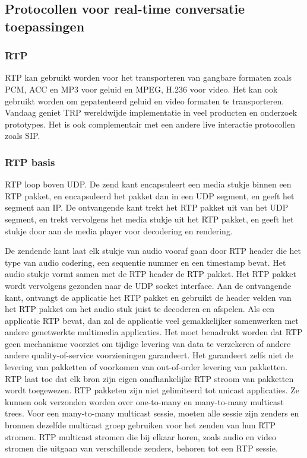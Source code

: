\subsection{Protocollen voor real-time conversatie toepassingen}

\subsubsection{RTP}

\noindent RTP kan gebruikt worden voor het transporteren van gangbare formaten zoals PCM, ACC en MP3 voor geluid en MPEG, H.236 voor video. Het kan ook gebruikt worden om gepatenteerd geluid en video formaten te transporteren. Vandaag geniet TRP wereldwijde implementatie in veel producten en onderzoek prototypes. Het is ook complementair met een andere live interactie protocollen zoals SIP.

\subsubsection{RTP basis}

\noindent RTP loop boven UDP. De zend kant encapsuleert een media stukje binnen een RTP pakket, en encapsuleerd het pakket dan in een UDP segment, en geeft het segment aan IP. De ontvangende kant trekt het RTP pakket uit van het UDP segment, en trekt vervolgens het media stukje uit het RTP pakket, en geeft het stukje door aan de media player voor decodering en rendering.

\noindent De zendende kant laat elk stukje van audio vooraf gaan door RTP header die het type van audio codering, een sequentie nummer en een timestamp bevat. Het audio stukje vormt samen met de RTP header de RTP pakket. Het RTP pakket wordt vervolgens gezonden naar de UDP socket interface. Aan de ontvangende kant, ontvangt de applicatie het RTP pakket en gebruikt de header velden van het RTP pakket om het audio stuk juist te decoderen en afspelen.
Als een applicatie RTP bevat, dan zal de applicatie veel gemakkelijker samenwerken met andere genetwerkte multimedia applicaties.
Het moet benadrukt worden dat RTP geen mechanisme voorziet om tijdige levering van data te verzekeren of andere andere quality-of-service voorzieningen garandeert. Het garandeert zelfs niet de levering van pakketten of voorkomen van out-of-order levering van pakketten.
RTP laat toe dat elk bron zijn eigen onafhankelijke RTP stroom van pakketten wordt toegewezen. RTP pakketen zijn niet gelimiteerd tot unicast applicaties. Ze kunnen ook verzonden worden over one-to-many en many-to-many multicast trees. Voor een many-to-many multicast sessie, moeten alle sessie zijn zenders en bronnen dezelfde multicast groep gebruiken voor het zenden van hun RTP stromen. RTP multicast stromen die bij elkaar horen, zoals audio en video stromen die uitgaan van verschillende zenders, behoren tot een RTP sessie.

